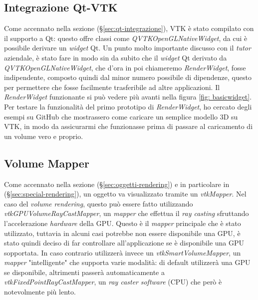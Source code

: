 \subsection{Integrazione Qt-VTK}
Come accennato nella sezione  (§\ref{sec:qt-integrazione}), VTK è stato compilato con il supporto a Qt: questo offre classi come \emph{QVTKOpenGLNativeWidget}, da cui è possibile derivare un \emph{widget} Qt. Un punto molto importante discusso con il \emph{tutor} aziendale, è stato fare in modo sin da subito che il \emph{widget} Qt derivato da \emph{QVTKOpenGLNativeWidget}, che d'ora in poi chiameremo \emph{RenderWidget}, fosse indipendente, composto quindi dal minor numero possibile di dipendenze, questo per permettere che fosse facilmente trasferibile ad altre applicazioni. Il \emph{RenderWidget} funzionante si può vedere più avanti nella figura \ref{fig: basicwidget}.
\\
Per testare la funzionalità del primo prototipo di \emph{RenderWidget}, ho cercato degli esempi su GitHub che mostrassero come caricare un semplice modello 3D su VTK, in modo da assicurarmi che funzionasse prima di passare al caricamento di un volume vero e proprio.

\subsection{Volume Mapper}
Come accennato nella sezione  (§\ref{sec:oggetti-rendering}) e in particolare in  (§\ref{sec:special-rendering}), un oggetto va visualizzato tramite un \emph{vtkMapper}. Nel caso del \emph{volume rendering}, questo può essere fatto utilizzando \emph{vtkGPUVolumeRayCastMapper}, un \emph{mapper} che effettua il \emph{ray casting} sfruttando l'accelerazione \emph{hardware} della GPU. Questo è il \emph{mapper} principale che è stato utilizzato, tuttavia in alcuni casi potrebbe non essere disponibile una GPU, è stato quindi deciso di far controllare all'applicazione se è disponibile una GPU sopportata. In caso contrario utilizzerà invece un \emph{vtkSmartVolumeMapper}, un \emph{mapper} "intelligente" che supporta varie modalità: di default utilizzerà una GPU se disponibile, altrimenti passerà automaticamente a \emph{vtkFixedPointRayCastMapper}, un \emph{ray caster} \emph{software} (CPU) che però è notevolmente più lento.

